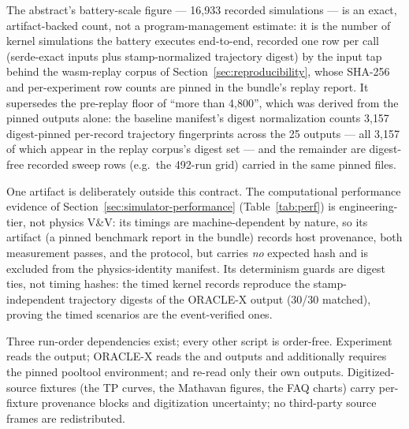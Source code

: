 The abstract's battery-scale figure --- 16{,}933 recorded simulations
--- is an exact, artifact-backed count, not a program-management
estimate: it is the number of kernel simulations the battery executes
end-to-end, recorded one row per call (serde-exact inputs plus
stamp-normalized trajectory digest) by the input tap behind the
wasm-replay corpus of Section~\ref{sec:reproducibility}, whose SHA-256
and per-experiment row counts are pinned in the bundle's replay report.
It supersedes the pre-replay floor of ``more than 4{,}800'', which was
derived from the pinned outputs alone: the baseline manifest's digest
normalization counts 3{,}157 digest-pinned per-record trajectory
fingerprints across the 25 outputs --- all 3{,}157 of which appear in the
replay corpus's digest set --- and the remainder are digest-free recorded sweep rows (e.g.\ the
492-run  grid) carried in the same pinned files.

One artifact is deliberately outside this contract. The computational
performance evidence of Section~\ref{sec:simulator-performance}
(Table~\ref{tab:perf}) is engineering-tier, not physics V\&V: its
timings are machine-dependent by nature, so its artifact (a pinned
benchmark report in the bundle) records host provenance, both
measurement passes, and the protocol, but
carries \emph{no} expected hash and is excluded from the physics-identity
manifest. Its determinism guards are digest ties, not timing hashes: the
timed kernel records reproduce the stamp-independent trajectory digests
of the ORACLE-X output (30/30 matched), proving the timed scenarios are
the event-verified ones.

Three run-order dependencies exist; every other script is order-free.
Experiment  reads the  output; ORACLE-X reads the
 and  outputs and additionally requires the pinned
pooltool environment;  and  re-read only their own
outputs. Digitized-source fixtures (the TP curves, the Mathavan figures,
the FAQ charts) carry per-fixture provenance blocks and digitization
uncertainty; no third-party source frames are redistributed.
